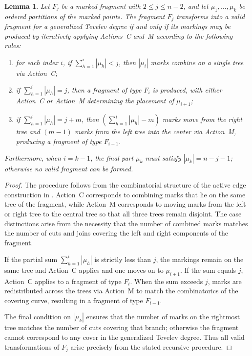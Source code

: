 \documentclass[11pt,reqno]{amsart}
\newtheorem{lemma}[theorem]{Lemma}
\theoremstyle{definition}
\begin{document}
\begin{lemma}
Let $F_j$ be a marked fragment with $2 \le j \le n-2$, and let $\mu_1,\dots,\mu_k$ be ordered partitions of the marked points.  
The fragment $F_j$ transforms into a valid fragment for a generalized Tevelev degree if and only if its markings may be produced by iteratively applying Actions~C and~M according to the following rules:
\begin{enumerate}
    \item for each index $i$, if $\sum_{h=1}^i |\mu_h| < j$, then $|\mu_i|$ marks combine on a single tree via Action~C;
    \item if $\sum_{h=1}^i |\mu_h| = j$, then a fragment of type $F_i$ is produced, with either Action~C or Action~M determining the placement of $\mu_{i+1}$;
    \item if $\sum_{h=1}^i |\mu_h| = j + m$, then $\left(\sum_{h=1}^i |\mu_h| - m\right)$ marks move from the right tree and $(m-1)$ marks from the left tree into the center via Action~M, producing a fragment of type $F_{i-1}$.
\end{enumerate}
Furthermore, when $i = k-1$, the final part $\mu_k$ must satisfy $|\mu_k| = n - j - 1$; otherwise no valid fragment can be formed.
\end{lemma}

\begin{proof}
The procedure follows from the combinatorial structure of the active edge construction in \cite{troptev}.  
Action~C corresponds to combining marks that lie on the same tree of the fragment, while Action~M corresponds to moving marks from the left or right tree to the central tree so that all three trees remain disjoint.  
The case distinctions arise from the necessity that the number of combined marks matches the number of cuts and joins covering the left and right components of the fragment.

If the partial sum $\sum_{h=1}^i |\mu_h|$ is strictly less than $j$, the markings remain on the same tree and Action~C applies and one moves on to $\mu_{i+1}$.  
If the sum equals $j$, Action~C applies to a fragment of type $F_i$.  
When the sum exceeds $j$, marks are redistributed across the trees via Action~M to match the combinatorics of the covering curve, resulting in a fragment of type $F_{i-1}$.

The final condition on $|\mu_k|$ ensures that the number of marks on the rightmost tree matches the number of cuts covering that branch; otherwise the fragment cannot correspond to any cover in the generalized Tevelev degree.  
Thus all valid transformations of $F_j$ arise precisely from the stated recursive procedure.
\end{proof}
\end{document}

